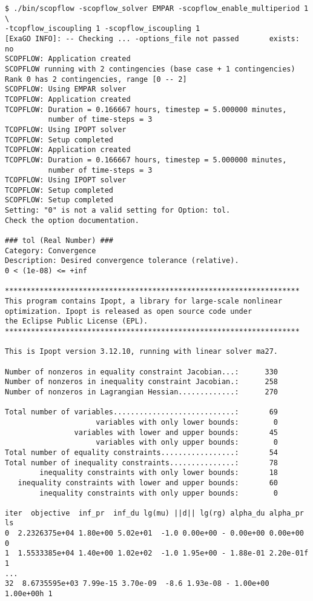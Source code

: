 \begin{lstlisting}
$ ./bin/scopflow -scopflow_solver EMPAR -scopflow_enable_multiperiod 1 \
-tcopflow_iscoupling 1 -scopflow_iscoupling 1
[ExaGO INFO]: -- Checking ... -options_file not passed       exists: no
SCOPFLOW: Application created
SCOPFLOW running with 2 contingencies (base case + 1 contingencies)
Rank 0 has 2 contingencies, range [0 -- 2]
SCOPFLOW: Using EMPAR solver
TCOPFLOW: Application created
TCOPFLOW: Duration = 0.166667 hours, timestep = 5.000000 minutes, 
          number of time-steps = 3
TCOPFLOW: Using IPOPT solver
TCOPFLOW: Setup completed
TCOPFLOW: Application created
TCOPFLOW: Duration = 0.166667 hours, timestep = 5.000000 minutes, 
          number of time-steps = 3
TCOPFLOW: Using IPOPT solver
TCOPFLOW: Setup completed
SCOPFLOW: Setup completed
Setting: "0" is not a valid setting for Option: tol. 
Check the option documentation.

### tol (Real Number) ###
Category: Convergence
Description: Desired convergence tolerance (relative).
0 < (1e-08) <= +inf

********************************************************************
This program contains Ipopt, a library for large-scale nonlinear 
optimization. Ipopt is released as open source code under 
the Eclipse Public License (EPL).
********************************************************************

This is Ipopt version 3.12.10, running with linear solver ma27.

Number of nonzeros in equality constraint Jacobian...:      330
Number of nonzeros in inequality constraint Jacobian.:      258
Number of nonzeros in Lagrangian Hessian.............:      270

Total number of variables............................:       69
                     variables with only lower bounds:        0
                variables with lower and upper bounds:       45
                     variables with only upper bounds:        0
Total number of equality constraints.................:       54
Total number of inequality constraints...............:       78
        inequality constraints with only lower bounds:       18
   inequality constraints with lower and upper bounds:       60
        inequality constraints with only upper bounds:        0

iter  objective  inf_pr  inf_du lg(mu) ||d|| lg(rg) alpha_du alpha_pr  ls
0  2.2326375e+04 1.80e+00 5.02e+01  -1.0 0.00e+00 - 0.00e+00 0.00e+00   0
1  1.5533385e+04 1.40e+00 1.02e+02  -1.0 1.95e+00 - 1.88e-01 2.20e-01f  1
...
32  8.6735595e+03 7.99e-15 3.70e-09  -8.6 1.93e-08 - 1.00e+00 1.00e+00h 1


\end{lstlisting}
